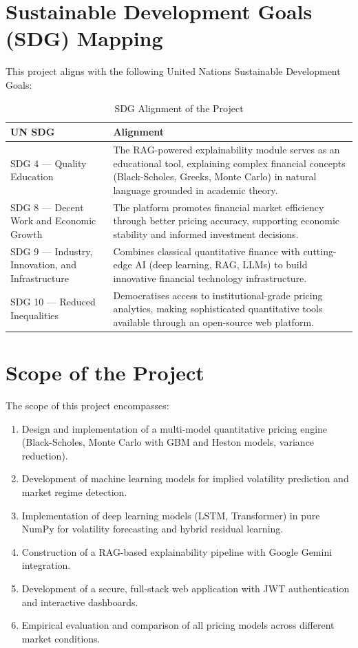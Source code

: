 \documentclass[12pt,a4paper]{report}
\begin{document}
\section{Sustainable Development Goals (SDG) Mapping}

This project aligns with the following United Nations Sustainable Development Goals:

\begin{table}[H]
\centering
\caption{SDG Alignment of the Project}
\label{tab:sdg}
\begin{tabularx}{\textwidth}{|l|X|}
\hline
\textbf{UN SDG} & \textbf{Alignment} \\
\hline
SDG 4 --- Quality Education & The RAG-powered explainability module serves as an educational tool, explaining complex financial concepts (Black-Scholes, Greeks, Monte Carlo) in natural language grounded in academic theory. \\
\hline
SDG 8 --- Decent Work and Economic Growth & The platform promotes financial market efficiency through better pricing accuracy, supporting economic stability and informed investment decisions. \\
\hline
SDG 9 --- Industry, Innovation, and Infrastructure & Combines classical quantitative finance with cutting-edge AI (deep learning, RAG, LLMs) to build innovative financial technology infrastructure. \\
\hline
SDG 10 --- Reduced Inequalities & Democratises access to institutional-grade pricing analytics, making sophisticated quantitative tools available through an open-source web platform. \\
\hline
\end{tabularx}
\end{table}

\section{Scope of the Project}

The scope of this project encompasses:

\begin{enumerate}
    \item Design and implementation of a multi-model quantitative pricing engine (Black-Scholes, Monte Carlo with GBM and Heston models, variance reduction).
    \item Development of machine learning models for implied volatility prediction and market regime detection.
    \item Implementation of deep learning models (LSTM, Transformer) in pure NumPy for volatility forecasting and hybrid residual learning.
    \item Construction of a RAG-based explainability pipeline with Google Gemini integration.
    \item Development of a secure, full-stack web application with JWT authentication and interactive dashboards.
    \item Empirical evaluation and comparison of all pricing models across different market conditions.
\end{enumerate}
\end{document}
